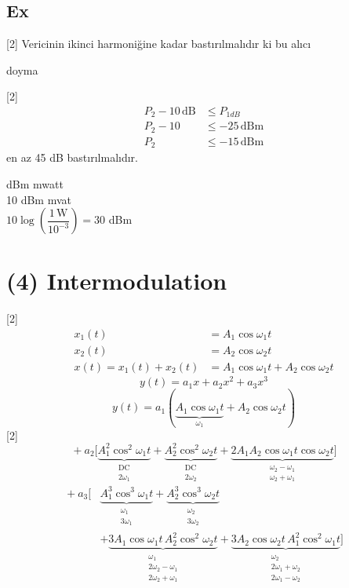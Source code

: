 \documentclass[11pt,a4paper]{article}
\begin{document}
\subsection{Ex}
[2]
Vericinin ikinci harmoniğine kadar bastırılmalıdır ki \quad bu alıcı

doyma 

[2]
\begin{align*}
P_2 - 10\,\mathrm{dB} &\le P_{1dB}\\
P_2 - 10 &\le -25\,\mathrm{dBm}\\
P_2 &\le -15\,\mathrm{dBm}
\end{align*}
en az 45 dB bastırılmalıdır.

\medskip
{} dBm  mwatt\\
10 dBm  mvat\\
$10\log\left(\dfrac{1\,\mathrm{W}}{10^{-3}}\right) = 30$ dBm

\section{(4) Intermodulation}
[2]
\begin{align*}
x_1(t) &= A_1\cos\omega_1t\\
x_2(t) &= A_2\cos\omega_2t\\
x(t) = x_1(t)+x_2(t) &= A_1\cos\omega_1t+A_2\cos\omega_2t
\end{align*}
\[ y(t) = a_1x + a_2x^2 + a_3x^3 \]
\[ y(t) = a_1(\underbrace{A_1\cos\omega_1t}_{\omega_1} + A_2\cos\omega_2t) \]
[2]
\[ {}+a_2\Big[\underbrace{A_1^2\cos^2\omega_1t}_{\substack{\mathrm{DC}\\2\omega_1}}+\underbrace{A_2^2\cos^2\omega_2t}_{\substack{\mathrm{DC}\\2\omega_2}}+\underbrace{2A_1A_2\cos\omega_1t\cos\omega_2t}_{\substack{\omega_2-\omega_1\\\omega_2+\omega_1}}\Big] \]
\begin{align*}
{}+a_3\Big[&\underbrace{A_1^3\cos^3\omega_1t}_{\substack{\omega_1\\3\omega_1}}+\underbrace{A_2^3\cos^3\omega_2t}_{\substack{\omega_2\\3\omega_2}}\\
&+\underbrace{3A_1\cos\omega_1t\,A_2^2\cos^2\omega_2t}_{\substack{\omega_1\\2\omega_2-\omega_1\\2\omega_2+\omega_1}}+\underbrace{3A_2\cos\omega_2t\,A_1^2\cos^2\omega_1t}_{\substack{\omega_2\\2\omega_1+\omega_2\\2\omega_1-\omega_2}}\Big]
\end{align*}
\end{document}
